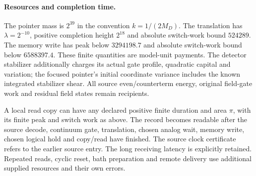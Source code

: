 \paragraph{Resources and completion time.}
The pointer mass is \(2^{39}\) in the convention \(k=1/(2M_D)\).
The translation has \(\lambda=2^{-10}\), positive completion height
\(2^{18}\) and absolute switch-work bound \(524289\).
The memory write has peak below \(3294198.7\) and absolute switch-work
bound below \(6588397.4\). These finite quantities are model-unit payments.
The detector stabilizer additionally charges its actual gate profile,
quadratic capital and variation; the focused pointer's initial coordinate
variance includes the known integrated stabilizer shear.
All source even/counterterm energy, original field-gate work and residual
field states remain recipients.

A local read copy can have any declared positive finite duration and
area \(\pi\), with its finite peak and switch work as above.
The record becomes readable after the source decode, continuum gate,
translation, chosen analog wait, memory write, chosen logical hold and
copy/read have finished. The source clock certificate refers to the
earlier source entry. The long receiving latency is explicitly retained.
Repeated reads, cyclic reset, bath preparation and remote delivery use
additional supplied resources and their own errors.


